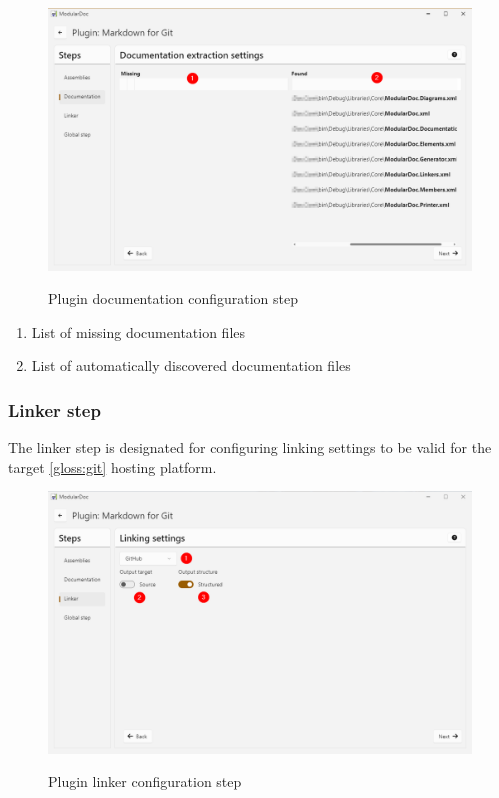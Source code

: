 \begin{figure}[H]
    \includegraphics[width=\linewidth]{img/modularDocDocumentation.png}
    \label{fig:modularDocumentation}
    \caption{Plugin documentation configuration step}
\end{figure}

\begin{enumerate}
    \item List of missing documentation files
    \item List of automatically discovered documentation files
\end{enumerate}

\pagebreak
\subsubsection{Linker step}

The linker step is designated for configuring linking settings to be valid for the target \ref{gloss:git} hosting platform.

\begin{figure}[H]
    \includegraphics[width=\linewidth]{img/modularDocLinker.png}
    \label{fig:modularLinker}
    \caption{Plugin linker configuration step}
\end{figure}


